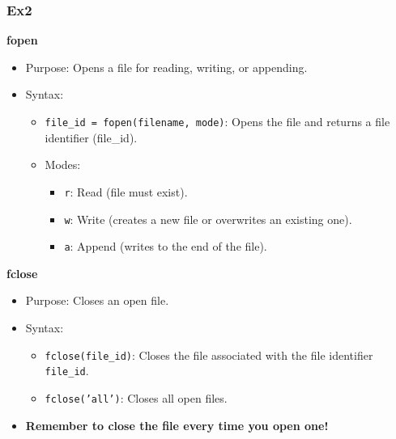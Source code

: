 \documentclass[
	11pt, %
]{beamer}
\begin{document}
\begin{frame}
    \frametitle{Ex2}

    \textbf{fopen}
    
    \begin{itemize}
        \item Purpose: Opens a file for reading, writing, or appending.
        \item Syntax:
            \begin{itemize}
                \item \texttt{file\_id = fopen(filename, mode)}: Opens the file and returns a file identifier (file\_id).
                \item Modes:
                    \begin{itemize}
                        \item \texttt{r}: Read (file must exist).
                        \item \texttt{w}: Write (creates a new file or overwrites an existing one).
                        \item \texttt{a}: Append (writes to the end of the file).
                    \end{itemize}
            \end{itemize}
    \end{itemize}
    \smallskip
    \textbf{fclose}
    
    \begin{itemize}
        \item Purpose: Closes an open file.
        \item Syntax:
            \begin{itemize}
                \item \texttt{fclose(file\_id)}: Closes the file associated with the file identifier \texttt{file\_id}.
                \item \texttt{fclose('all')}: Closes all open files.
            \end{itemize}
        \item \textbf{Remember to close the file every time you open one!}
    \end{itemize}
\end{frame}

\end{document}
